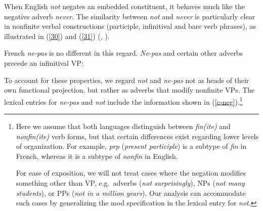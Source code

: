 \documentclass[output=paper]{langsci/langscibook}
\begin{document}
When English {\it not} negates an embedded constituent, it behaves
much like the negative adverb {\it never}. The similarity between {\it
not} and {\it never} is particularly clear in nonfinite verbal
constructions (participle, infinitival and bare verb phrases), as
illustrated in (\ref{30}) and (\ref{31}) (\citet{Klima:64}, \citet{Baker:89,Baker:91}).

\be
\ex \label{30} \begin{xlist}
\end{xlist}
\ee

\be
\ex \label{31}\begin{xlist}
\end{xlist}
\ee

\noindent
French {\it ne-pas} is no different in this regard.  {\it Ne-pas} and
certain other adverbs precede an infinitival VP:



\be
\ex \begin{xlist}
\end{xlist}
\ee


To account for these properties, we regard {\it not} and {\it ne-pas} not as
heads of their own functional projection, but rather as adverbs that modify
nonfinite VPs. The lexical entries for {\it ne-pas} and {\it not} include the
information shown in (\ref{c-neg}).\footnote{Here we assume that both languages
distinguish between {\it fin(ite)} and {\it nonfin(ite)} verb forms, but that
certain differences exist regarding lower levels of organization. For example,
{\it prp} ({\it present participle}) is a subtype of {\it fin} in French,
whereas it is a subtype of {\it nonfin} in English.


For ease of exposition, we will not treat cases where the negation modifies
something other than VP, e.g.\ adverbs ({\it not surprisingly}), NPs ({\it not
many students}), or PPs ({\it not in a million years}). Our analysis
can accommodate such cases by generalizing the {\sc mod} specification in
the lexical entry for {\it not}.}
\end{document}
